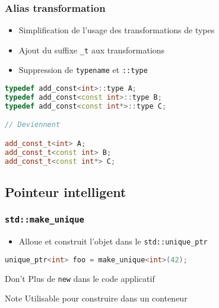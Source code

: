 \documentclass[C++.tex]{subfiles}
\begin{document}
\begin{frame}[fragile]
	\frametitle{Alias transformation}
	\begin{itemize}
		\item Simplification de l'usage des transformations de types
		\item Ajout du suffixe \lstinline|_t| aux transformations
		\item Suppression de \lstinline|typename| et \lstinline|::type|
	\end{itemize}

	\begin{lstlisting}[language=C++]
typedef add_const<int>::type A;
typedef add_const<const int>::type B;
typedef add_const<const int*>::type C;

// Deviennent

add_const_t<int> A;
add_const_t<const int> B;
add_const_t<const int*> C;\end{lstlisting}
\end{frame}

\subsection*{Pointeur intelligent}
\begin{frame}[fragile]
	\frametitle{\lstinline|std::make_unique|}
	\begin{itemize}
		\item Alloue et construit l'objet dans le \lstinline|std::unique_ptr|
	\end{itemize}

	\begin{lstlisting}[language=C++]
unique_ptr<int> foo = make_unique<int>(42);\end{lstlisting}

	\begin{alertblock}{Don't}
		Plus de \lstinline|new| dans le code applicatif
	\end{alertblock}

	\begin{block}{Note}
		Utilisable pour construire dans un conteneur
	\end{block}
\end{frame}
\end{document}
